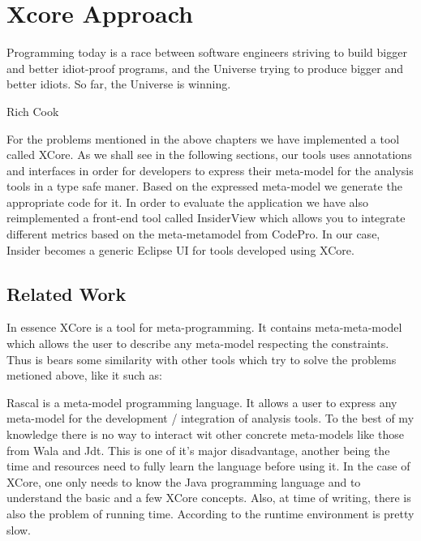 \chapter{Xcore Approach}\label{ch:2}

\epigraph{Programming today is a race between software engineers striving to
build bigger and better idiot-proof programs, and the Universe trying to produce
bigger and better idiots. So far, the Universe is winning.}{Rich Cook}

        For the problems mentioned in the above chapters we have implemented a tool called XCore.
As we shall see in the following sections, our tools uses annotations and interfaces in order for developers
to express their meta-model for the analysis tools in a type safe maner. Based on the expressed meta-model
we generate the appropriate code for it.
        In order to evaluate the application we have also reimplemented a front-end tool called InsiderView 
\cite{tools:iPlasma} which allows you to integrate different  metrics based on the meta-metamodel from CodePro.
In our case, Insider becomes a generic Eclipse UI for tools developed using XCore.

\section{Related Work}
       
        In essence XCore is a tool for meta-programming. It contains meta-meta-model which allows the user to describe any meta-model respecting the constraints. Thus is bears some similarity
 with other tools which try to solve the problems metioned above, like it such as:
                \begin{description}[labelindent=2cm]
                        \item[Rascal] \cite{tools:rascal}
                        \item[Soot] \cite{tools:soot}
                        \item[Fame] \cite{tools:fame}
                \end{description}
        Rascal is a meta-model programming language. It allows a user to express any meta-model for the development / integration of analysis tools. To the best of my knowledge there is no way
to interact wit other concrete meta-models like those from Wala and Jdt. This is one of it's major disadvantage, another being the time and resources need to fully learn the language before using
it. In the case of XCore, one only needs to know the Java programming language and to understand the basic and a few XCore concepts.  Also, at time of writing, there is also the problem of running time. 
According to \cite{tools:rascal} the runtime environment is pretty slow.

